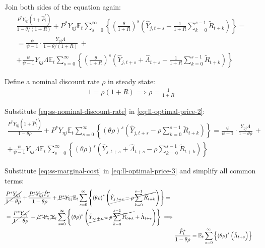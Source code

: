 \documentclass[
	12pt,
	]{article}
\numberwithin{equation}{section}
\newcommand{\E}[1][t]{{\mathbb{E}_{#1}}}
\theoremstyle{definition}
\theoremstyle{plain}
\theoremstyle{plain}
\theoremstyle{plain}
\begin{document}
Join both sides of the equation again:
\begin{multline}
	\frac{ P^\ast Y_{\eta j} ( 1 + \hat{P}_t^\ast ) }{1-\theta /(1+R)} + P^\ast Y_{\eta j} \E \sum_{s=0}^{\infty} \left\{ \left( \frac{\theta}{1 + R} \right)^s \left( \hat{Y}_{j,t+s} - \frac{1}{1 + R} \sum_{k=0}^{s-1} \widetilde{R}_{t+k} \right) \right\} = 
	\\
	= \frac{\psi}{\psi-1} \cdot \frac{Y_{\eta j} \Lambda}{1-\theta /(1+R)} \, + 
	\\
	+ \frac{\psi}{\psi-1} Y_{\eta j} \Lambda \E \sum_{s=0}^{\infty} \left\{ \left( \frac{\theta}{1 + R} \right)^s \left( \hat{Y}_{j,t+s} + \hat{\Lambda}_{t+s} - \frac{1}{1 + R} \sum_{k=0}^{s-1} \widetilde{R}_{t+k} \right) \right\} \label{eq:ll-optimal-price-2}
\end{multline}

Define a nominal discount rate $\rho$ in steady state:
\begin{align}
	1 = \rho (1 + R) \implies \rho = \frac{1}{1 + R} \label{eq:ss-nominal-discount-rate}
\end{align}

Substitute \ref{eq:ss-nominal-discount-rate} in \ref{eq:ll-optimal-price-2}:
\begin{multline}
	\frac{ P^\ast Y_{\eta j} ( 1 + \hat{P}_t^\ast ) }{1- \theta \rho} + P^\ast Y_{\eta j} \E \sum_{s=0}^{\infty} \left\{ \left( \theta \rho \right)^s \left( \hat{Y}_{j,t+s} - \rho \sum_{k=0}^{s-1} \widetilde{R}_{t+k} \right) \right\} = \frac{\psi}{\psi-1} \cdot \frac{Y_{\eta j} \Lambda}{1- \theta \rho } \, + 
	\\ 
	+ \frac{\psi}{\psi-1} Y_{\eta j} \Lambda \E \sum_{s=0}^{\infty} \left\{ \left( \theta \rho \right)^s \left( \hat{Y}_{j,t+s} + \hat{\Lambda}_{t+s} - \rho \sum_{k=0}^{s-1} \widetilde{R}_{t+k} \right) \right\} \label{eq:ll-optimal-price-3}
\end{multline}

Substitute \ref{eq:ss-marginal-cost} in \ref{eq:ll-optimal-price-3} and simplify all common terms:
\begin{align}
	\begin{split}
		& \cancel{\frac{P^\ast Y_{\eta j}}{1-\theta\rho}} + \frac{ \cancel{P^\ast Y_{\eta j}} \hat{P}_t^\ast }{1- \theta \rho} + \cancel{P^\ast Y_{\eta j}} \E \sum_{s=0}^{\infty} \left\{ \left( \theta \rho \right)^s \left( \cancel{\hat{Y}_{j,t+s} - \rho \sum_{k=0}^{s-1} \widetilde{R}_{t+k}} \right) \right\} = 
		\\
		& = \cancel{\frac{P^\ast Y_{\eta j}}{1-\theta\rho}} \, + \cancel{P^\ast Y_{\eta j}} \E \sum_{s=0}^{\infty} \left\{ \left( \theta \rho \right)^s \left( \cancel{\hat{Y}_{j,t+s} - \rho \sum_{k=0}^{s-1} \widetilde{R}_{t+k}} + \hat{\Lambda}_{t+s} \right) \right\} \implies	
	\end{split} \nonumber \\
	& \frac{ \hat{P}_t^\ast }{1- \theta \rho} = \E \sum_{s=0}^{\infty} \left\{ \left( \theta \rho \right)^s \left( \hat{\Lambda}_{t+s} \right) \right\} \label{eq:ll-optimal-price-4}
\end{align}
\end{document}
